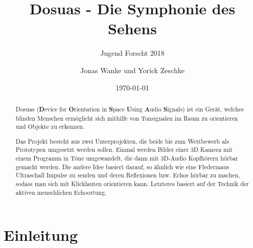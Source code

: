 \documentclass[a4paper,12pt,ngerman]{scrartcl}
\title{Dosuas - Die Symphonie des Sehens}
\subtitle{Jugend Forscht 2018}
\author{Jonas Wanke und Yorick Zeschke}
\date{\today}
\begin{document}
\maketitle


\begin{abstract}
	Dosuas (\textbf{D}evice for \textbf{O}rientation in \textbf{S}pace \textbf{U}sing 
	\textbf{A}udio \textbf{S}ignals) ist ein Gerät, welches blinden Menschen ermöglicht
	sich mithilfe von Tonsignalen im Raum zu orientieren und Objekte zu erkennen.\par
	Das Projekt besteht aus zwei Unterprojekten, die beide bis zum 
	Wettbewerb als Prototypen umgesetzt werden sollen. Einmal werden Bilder einer 3D Kamera
	mit einem Programm in Töne umgewandelt, die dann mit 3D-Audio Kopfhörern hörbar gemacht
	werden. Die andere Idee basiert darauf, so ähnlich wie eine Fledermaus Ultraschall 
	Impulse zu senden und deren Reflexionen bzw. Echos hörbar zu machen, sodass man
	sich mit Klicklauten orientieren kann. Letzteres basiert auf der Technik der aktiven
	menschlichen Echoortung.
\end{abstract}

\tableofcontents

\newpage

\section{Einleitung}
\end{document}
